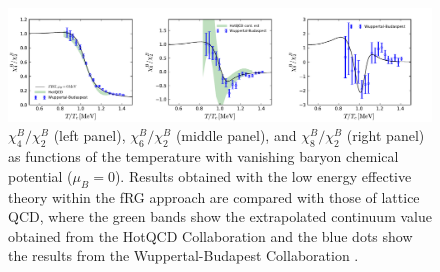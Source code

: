 \documentclass[%
reprint,
superscriptaddress,
showpacs,preprintnumbers,
 amsmath,amssymb,
 aps,
prd,
]{revtex4-1}
\begin{document}
%
\begin{figure}[t]
\includegraphics[width=1\textwidth]{R42R62R82-T-muB0}
\caption{$\chi^{B}_{4}/\chi^{B}_{2}$ (left panel), $\chi^{B}_{6}/\chi^{B}_{2}$ (middle panel), and $\chi^{B}_{8}/\chi^{B}_{2}$ (right panel) as functions of the temperature with vanishing baryon chemical potential ($\mu_B=0$). Results obtained with the low energy effective theory within the fRG approach are compared with those of lattice QCD, where the green bands show the extrapolated continuum value obtained from the HotQCD Collaboration \cite{Bazavov:2017dus,Bazavov:2017tot} and the blue dots show the results from the Wuppertal-Budapest Collaboration \cite{Borsanyi:2018grb}.
}\label{fig:R42R62R82-T-muB0}
\end{figure}
%
\end{document}

